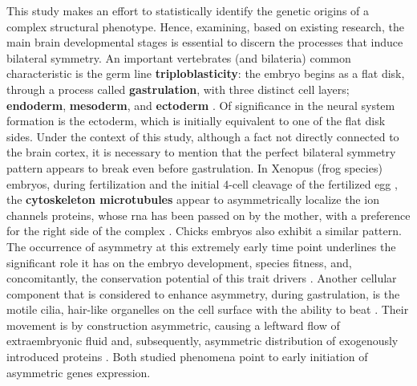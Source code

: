 This study makes an effort to statistically identify the genetic origins of a complex structural phenotype. Hence, examining, based on existing research, the main brain developmental stages is essential to discern the processes that induce bilateral symmetry. An important vertebrates (and bilateria) common characteristic is the germ line \textbf{triploblasticity}: the embryo begins as a flat disk, through a process called \textbf{gastrulation}, with three distinct cell layers; \textbf{endoderm}, \textbf{mesoderm}, and \textbf{ectoderm} \cite{F.Bear2016a}.  Of significance in the neural system formation is the ectoderm, which is initially equivalent to one of the flat disk sides. Under the context of this study, although a fact not directly connected to the brain cortex, it is necessary to mention that the perfect bilateral symmetry pattern appears to break even before gastrulation. In Xenopus (frog species) embryos, during fertilization and the initial 4-cell cleavage of the fertilized egg , the \textbf{cytoskeleton microtubules} appear to asymmetrically localize the ion channels proteins, whose \acs{rna} has been passed on by the mother, with a preference for the right side of the complex \cite{Aw2008}. Chicks embryos also exhibit a similar pattern. The occurrence of asymmetry at this extremely early time point underlines the significant role it has on the embryo development, species fitness, and, concomitantly, the conservation potential of this trait drivers \cite{Aw2009}. Another cellular component that is considered to enhance asymmetry, during gastrulation, is the motile cilia, hair-like organelles on the cell surface with the ability to beat \cite{Grimes2017}. Their movement is by construction asymmetric, causing a leftward flow of extraembryonic fluid and, subsequently, asymmetric distribution of exogenously introduced proteins \cite{Okada2005}. Both studied phenomena point to early initiation of asymmetric genes expression.

